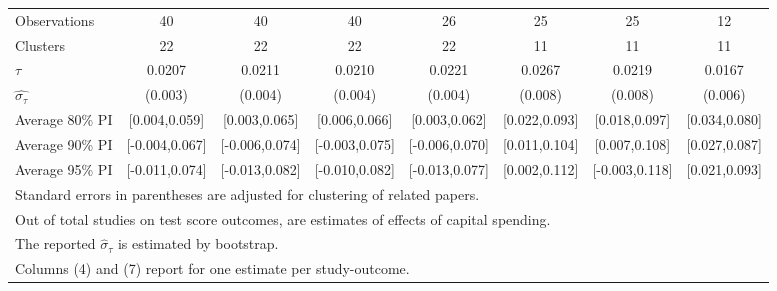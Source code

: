 \begin{table}[htbp]
\begin{tabular}{l*{7}{c}}
Observations        &          40&          40&          40&          26&          25&          25&          12\\
Clusters            &          22&          22&          22&          22&          11&          11&          11\\
$\tau$              &      0.0207&      0.0211&      0.0210&      0.0221&      0.0267&      0.0219&      0.0167\\
$\hat{\sigma_{\tau}}$&     (0.003)&     (0.004)&     (0.004)&     (0.004)&     (0.008)&     (0.008)&     (0.006)\\
Average 80\% PI     &[0.004,0.059]&[0.003,0.065]&[0.006,0.066]&[0.003,0.062]&[0.022,0.093]&[0.018,0.097]&[0.034,0.080]\\
Average 90\% PI     &[-0.004,0.067]&[-0.006,0.074]&[-0.003,0.075]&[-0.006,0.070]&[0.011,0.104]&[0.007,0.108]&[0.027,0.087]\\
Average 95\% PI     &[-0.011,0.074]&[-0.013,0.082]&[-0.010,0.082]&[-0.013,0.077]&[0.002,0.112]&[-0.003,0.118]&[0.021,0.093]\\
\hline\hline
\multicolumn{8}{l}{\footnotesize Standard errors in parentheses are adjusted for clustering of related papers.}\\
\multicolumn{8}{l}{\footnotesize Out of  total studies on test score outcomes,  are estimates of effects of capital spending.}\\
\multicolumn{8}{l}{\footnotesize The reported $\hat{\sigma}_{\tau}$ is estimated by bootstrap.}\\
\multicolumn{8}{l}{\footnotesize Columns (4) and (7) report for one estimate per study-outcome.}\\
\end{tabular}
\end{table}
